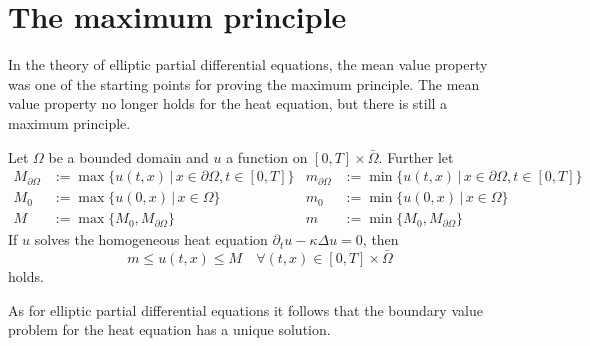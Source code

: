 %
%
%
\section{The maximum principle}
In the theory of elliptic partial differential equations, the mean
value property was one of the starting points for proving the
maximum principle.
The mean value property no longer holds for the heat equation,
but there is still a maximum principle.

\begin{satz}
Let $\Omega$ be a bounded domain and 
$u$ a function on $[0,T]\times\bar{\Omega}$.
Further let
\begin{align*}
M_{\partial \Omega}&:=\max\{u(t,x)\,|\,x\in\partial\Omega, t\in[0,T]\}
&
m_{\partial \Omega}&:=\min\{u(t,x)\,|\,x\in\partial\Omega, t\in[0,T]\}
\\
M_0&:=
\max\{u(0,x)\,|\,x\in\Omega\}
&
m_0&:=
\min\{u(0,x)\,|\,x\in\Omega\}
\\
M&:=\max\{M_0,M_{\partial\Omega}\}
&
m&:=\min\{M_0,M_{\partial\Omega}\}
\end{align*}
If $u$ solves the homogeneous heat equation 
$\partial_tu-\kappa\Delta u=0$,
then
\[
m\le u(t,x)\le M\quad\forall(t,x)\in[0,T]\times\bar\Omega
\]
holds.
\end{satz}
As for elliptic partial differential equations it follows that
the boundary value problem for the heat equation has a unique solution.

